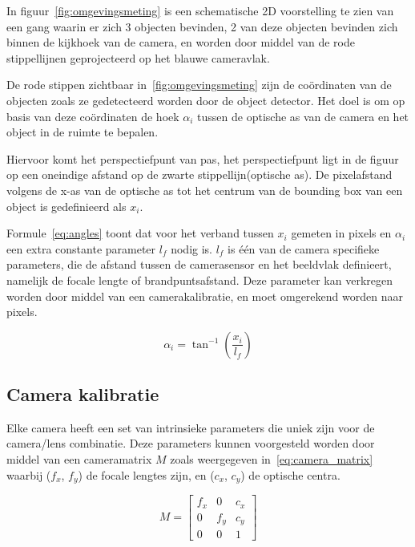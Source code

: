 In figuur~\ref{fig:omgevingsmeting} is een schematische 2D voorstelling te zien van een gang waarin er zich 3 objecten bevinden, 2 van deze objecten bevinden zich
binnen de kijkhoek van de camera, en worden door middel van de rode stippellijnen geprojecteerd op het blauwe cameravlak.

De rode stippen zichtbaar in~\ref{fig:omgevingsmeting} zijn de co\"{o}rdinaten van de objecten zoals ze gedetecteerd worden door de object detector.
Het doel is om op basis van deze co\"{o}rdinaten de hoek $\alpha_i$ tussen de optische as van de camera en het object in de ruimte te bepalen.

Hiervoor komt het perspectiefpunt van pas, het perspectiefpunt ligt in de figuur op een oneindige afstand op de zwarte stippellijn(optische as).
De pixelafstand volgens de x-as van de optische as tot het centrum van de bounding box van een object is gedefinieerd als $x_i$.

Formule~\ref{eq:angles} toont dat voor het verband tussen $x_i$ gemeten in pixels en $\alpha_i$ een extra constante parameter $l_f$ nodig is.
$l_f$ is \'{e}\'{e}n van de camera specifieke parameters, die de afstand tussen de camerasensor en het beeldvlak definieert, namelijk de focale lengte of brandpuntsafstand.
Deze parameter kan verkregen worden door middel van een camerakalibratie, en moet omgerekend worden naar pixels.

\begin{equation}
    \alpha_i = \tan^{-1}(\frac{x_i}{l_f})
    \label{eq:angles}
\end{equation}


\subsection{Camera kalibratie}
Elke camera heeft een set van intrinsieke parameters die uniek zijn voor de camera/lens combinatie.
Deze parameters kunnen voorgesteld worden door middel van een cameramatrix $M$ zoals weergegeven in~\ref{eq:camera_matrix} waarbij ($f_x$, $f_y$) de focale lengtes zijn, en ($c_x$, $c_y$) de optische centra.

\begin{equation}
    M = \begin{bmatrix}
            f_x &  0  & c_x \\
            0   & f_y & c_y \\
            0   &  0  &  1
    \end{bmatrix}
    \label{eq:camera_matrix}
\end{equation}

